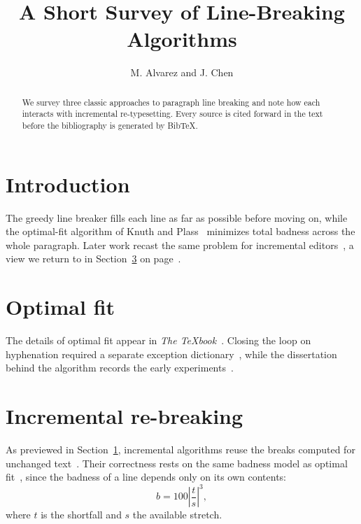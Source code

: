 \documentclass[11pt]{article}
\title{A Short Survey of Line-Breaking Algorithms}
\author{M. Alvarez and J. Chen}
\date{}
\begin{document}
\maketitle

\begin{abstract}
We survey three classic approaches to paragraph line breaking and note how
each interacts with incremental re-typesetting. Every source is cited forward
in the text before the bibliography is generated by BibTeX.
\end{abstract}

\tableofcontents

\section{Introduction}
\label{sec:intro}

The greedy line breaker fills each line as far as possible before moving on,
while the optimal-fit algorithm of Knuth and Plass~\cite{plass81} minimizes
total badness across the whole paragraph. Later work recast the same problem
for incremental editors~\cite{adapton}, a view we return to in
Section~\ref{sec:incremental} on page~\pageref{sec:incremental}.

\section{Optimal fit}
\label{sec:optimal}

The details of optimal fit appear in \emph{The \TeX book}~\cite{knuth84}.
Closing the loop on hyphenation required a separate exception
dictionary~\cite{hyphen}, while the dissertation behind the algorithm records
the early experiments~\cite{plass-thesis}.
\nocite{*}

\section{Incremental re-breaking}
\label{sec:incremental}

As previewed in Section~\ref{sec:intro}, incremental algorithms reuse the
breaks computed for unchanged text~\cite{adapton}. Their correctness rests on
the same badness model as optimal fit~\cite{plass81}, since the badness of a
line depends only on its own contents:
\begin{equation}
  \label{eq:badness}
  b = 100 \left\lvert \frac{t}{s} \right\rvert^3,
\end{equation}
where $t$ is the shortfall and $s$ the available stretch.



\end{document}
